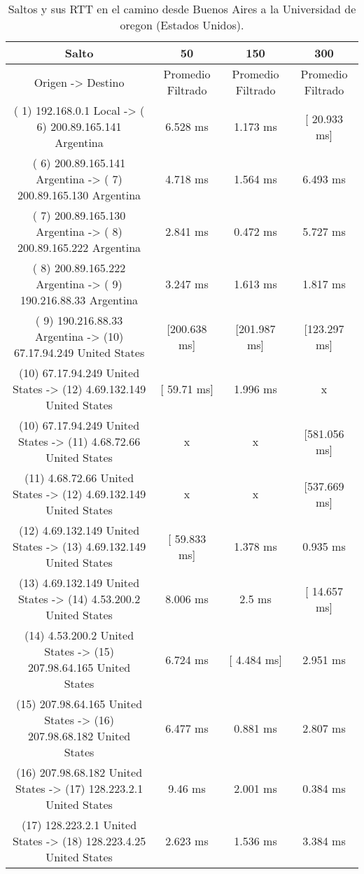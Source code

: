\begin{table}[]
\centering
\caption{Saltos y sus RTT en el camino desde Buenos Aires a la Universidad de oregon (Estados Unidos).}
\begin{tabular}{ | c | c | c | c | }
	\hline 
Salto	& 50	& 150	& 300 \\ \hline
               Origen                ->               Destino               	&Promedio Filtrado&	Promedio Filtrado&	Promedio Filtrado \\ \hline
( 1) 192.168.0.1     Local           -> ( 6) 200.89.165.141  Argentina     & 	     6.528 ms  & 	     1.173 ms   &	  [ 20.933 ms]   \\ \hline
( 6) 200.89.165.141  Argentina       -> ( 7) 200.89.165.130  Argentina     & 	     4.718 ms  & 	     1.564 ms   &	     6.493 ms    \\ \hline
( 7) 200.89.165.130  Argentina       -> ( 8) 200.89.165.222  Argentina     & 	     2.841 ms  & 	     0.472 ms   &	     5.727 ms    \\ \hline
( 8) 200.89.165.222  Argentina       -> ( 9) 190.216.88.33   Argentina     & 	     3.247 ms  & 	     1.613 ms   &	     1.817 ms    \\ \hline
( 9) 190.216.88.33   Argentina       -> (10) 67.17.94.249    United States & 	  [200.638 ms] & 	  [201.987 ms]  &	  [123.297 ms]   \\ \hline
(10) 67.17.94.249    United States   -> (12) 4.69.132.149    United States  &	  [  59.71 ms]  &	     1.996 ms    &     	x \\ \hline
(10) 67.17.94.249    United States   -> (11) 4.68.72.66      United States   &       	x      	 &           x	     &     [581.056 ms]   \\ \hline
(11) 4.68.72.66      United States   -> (12) 4.69.132.149    United States  &	       x        &   	       x	     &     [537.669 ms]   \\ \hline
(12) 4.69.132.149    United States   -> (13) 4.69.132.149    United States & 	  [ 59.833 ms] & 	     1.378 ms   &	     0.935 ms    \\ \hline
(13) 4.69.132.149    United States   -> (14) 4.53.200.2      United States & 	     8.006 ms  & 	       2.5 ms   &	  [ 14.657 ms]   \\ \hline
(14) 4.53.200.2      United States   -> (15) 207.98.64.165   United States & 	     6.724 ms  & 	  [  4.484 ms]  &	     2.951 ms    \\ \hline
(15) 207.98.64.165   United States   -> (16) 207.98.68.182   United States & 	     6.477 ms  & 	     0.881 ms   &	     2.807 ms    \\ \hline
(16) 207.98.68.182   United States   -> (17) 128.223.2.1     United States & 	      9.46 ms  & 	     2.001 ms   &	     0.384 ms    \\ \hline
(17) 128.223.2.1     United States   -> (18) 128.223.4.25    United States & 	     2.623 ms  & 	     1.536 ms   &	     3.384 ms    \\ \hline

\end{tabular}
\end{table}
